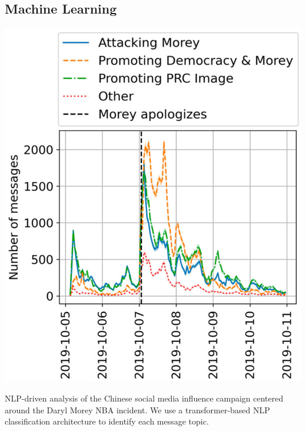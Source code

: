 \documentclass{tufte-handout}
\begin{document}
\subsection{Machine Learning}

\begin{marginfigure}%
  \includegraphics[width=\linewidth]{morey}
  \caption{NLP-driven analysis of the Chinese social media influence campaign centered around the Daryl Morey NBA incident. We use a transformer-based NLP classification architecture to identify each message topic.}
  \label{fig:morey}
\end{marginfigure}
\end{document}
